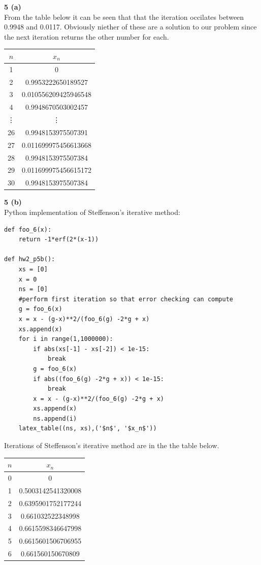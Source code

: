 \documentclass[12pt]{article}
\newcommand{\problem}[1]{\hspace{-4 ex} \large \textbf{#1}\\}
\begin{document}
\problem{5 (a)}
	From the table below it can be seen that that the iteration occilates between 0.9948 and 0.0117. Obviously niether of these are a solution to our problem since the next iteration returns the other number for each.
	\begin{center}
		\begin{tabular}{|c|c|}
			\hline
			$n$&$x_n$\\ \hline
			1&0\\ \hline
			2&0.9953222650189527\\ \hline
			3&0.010556209425946548\\ \hline
			4&0.9948670503002457\\ \hline
			\vdots & \vdots \\ \hline
			26&0.9948153975507391\\ \hline
			27&0.011699975456613668\\ \hline
			28&0.9948153975507384\\ \hline
			29&0.011699975456615172\\ \hline
			30&0.9948153975507384\\ \hline
		\end{tabular}
	\end{center}
	
\problem{5 (b)}
	Python implementation of Steffenson's iterative method:
	\singlespacing
	\begin{lstlisting}
def foo_6(x):
	return -1*erf(2*(x-1))
	
def hw2_p5b():
	xs = [0]
	x = 0
	ns = [0]
	#perform first iteration so that error checking can compute
	g = foo_6(x)
	x = x - (g-x)**2/(foo_6(g) -2*g + x)
	xs.append(x)
	for i in range(1,1000000): 
		if abs(xs[-1] - xs[-2]) < 1e-15:
			break
		g = foo_6(x)
		if abs((foo_6(g) -2*g + x)) < 1e-15:
			break
		x = x - (g-x)**2/(foo_6(g) -2*g + x)
		xs.append(x)
		ns.append(i)
	latex_table((ns, xs),('$n$', '$x_n$'))
	\end{lstlisting}
	\doublespacing
	Iterations of Steffenson's iterative method are in the the table below.
	\begin{center}
		\begin{tabular}{|c|c|}
			\hline
			$n$&$x_n$\\ \hline
			0&0\\ \hline
			1&0.5003142541320008\\ \hline
			2&0.6395901752177244\\ \hline
			3&0.661032522348998\\ \hline
			4&0.6615598346647998\\ \hline
			5&0.6615601506706955\\ \hline
			6&0.661560150670809\\ \hline
		\end{tabular}
	\end{center}
\end{document}
